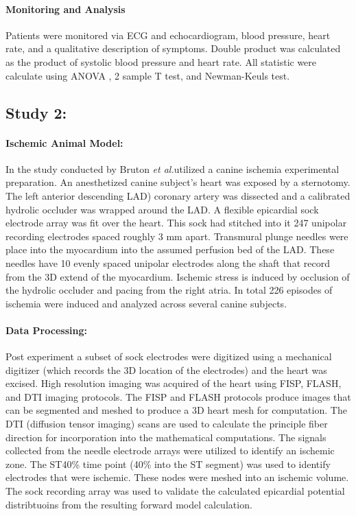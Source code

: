 \documentclass[12pt]{article}
\newcommand{\etal}{{\em et al.}}
\begin{document}
\paragraph{Monitoring and Analysis}
Patients were monitored via ECG and echocardiogram, blood pressure, heart rate, and a qualitative description of symptoms. Double product was calculated as the product of systolic blood pressure and heart rate. All statistic were calculate using ANOVA , 2 sample T test, and Newman-Keuls test.


\subsection{Study 2: }
\paragraph{Ischemic Animal Model:}
In the study conducted by Bruton \etal utilized a canine ischemia experimental preparation. An anesthetized canine subject's heart was exposed by a sternotomy. The left anterior descending LAD) coronary artery was dissected and a calibrated hydrolic occluder was wrapped around the LAD. A flexible epicardial sock electrode array was fit over the heart. This sock had stitched into it 247 unipolar recording electrodes spaced roughly 3 mm apart. Transmural plunge needles were place into the myocardium into the assumed perfusion bed of the LAD. These needles have 10 evenly spaced unipolar electrodes along the shaft that record from the 3D extend of the myocardium. Ischemic stress is induced by occlusion of the hydrolic occluder and pacing from the right atria. In total 226 episodes of ischemia were induced and analyzed across several canine subjects.

\paragraph{Data Processing:}
Post experiment a subset of sock electrodes were digitized using a mechanical digitizer (which records the 3D location of the electrodes) and the heart was excised. High resolution imaging was acquired of the heart using FISP, FLASH, and DTI imaging protocols. The FISP and FLASH protocols produce images that can be segmented and meshed to produce a 3D heart mesh for computation. The DTI (diffusion tensor imaging) scans are used to calculate the principle fiber direction for incorporation into the mathematical computations. The signals collected from the needle electrode arrays were utilized to identify an ischemic zone. The ST40\% time point (40\% into the ST segment) was used to identify electrodes that were ischemic. These nodes were meshed into an ischemic volume. The sock recording array was used to validate the calculated epicardial potential distribtuoins from the resulting forward model calculation.
\end{document}
